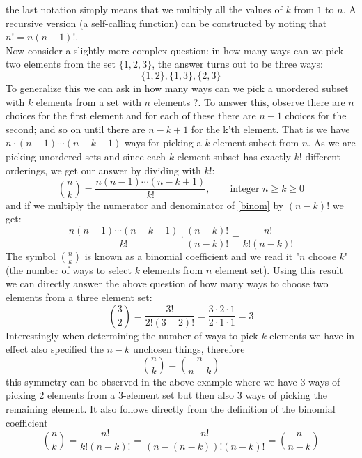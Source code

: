 the last notation simply means that we multiply all the values of $k$ from $1$ to $n$. A recursive version (a self-calling function) can be constructed by noting that $n! = n(n-1)!$. \\

\myindent Now consider a slightly more complex question: in how many ways can we pick two elements from the set $\{1,2,3\}$, the answer turns out to be three ways:
\[
\{1, 2\}, \{1, 3\}, \{2, 3\}
\]
To generalize this we can ask in how many ways can we pick a unordered subset with $k$ elements from a set with $n$ elements ?. To answer this, observe there are $n$ choices for the first element and for each of these there are $n - 1$ choices for the second; and so on until there are $n - k + 1$ for the k'th element. That is we have $n \cdot (n-1) \cdots (n - k + 1)$ ways for picking a $k$-element subset from $n$. As we are picking unordered sets and since each $k$-element subset has exactly $k!$ different orderings, we get our answer by dividing with $k!$:
\begin{equation}\label{binom}
\binom{n}{k} = \frac{n(n-1) \cdots (n - k + 1)}{k!},  \qquad \text{integer } n \geq k \geq 0
\end{equation}
and if we multiply the numerator and denominator of \ref{binom} by $(n - k)!$ we get:
\[
\frac{n(n-1) \cdots (n - k + 1)}{k!} \cdot \frac{(n - k)!}{(n - k)!} =  \frac{n!}{k!(n-k)!}
\]
The symbol $\binom{n}{k}$ is known as a binomial coefficient and we read it "$n$ choose $k$" (the number of ways to select $k$ elements from $n$ element set). Using this result we can directly answer the above question of how many ways to choose two elements from a three element set:
\[
\binom{3}{2}  = \frac{3!}{2! (3-2)!} = \frac{3 \cdot 2 \cdot 1}{2 \cdot 1 \cdot 1} = 3
\]
Interestingly when determining the number of ways to pick $k$ elements we have in effect also specified the $n-k$ unchosen things, therefore
\begin{equation}\label{binom_symmetry}
\binom{n}{k} = \binom{n}{n-k}
\end{equation}
this symmetry can be observed in the above example where we have $3$ ways of picking $2$ elements from a $3$-element set but then also $3$ ways of picking the remaining element. It also follows directly from the definition of the binomial coefficient
\[
\binom{n}{k} =  \frac{n!}{k!(n-k)!} =  \frac{n!}{(n-(n-k))!(n-k)!} = \binom{n}{n-k}
\]

